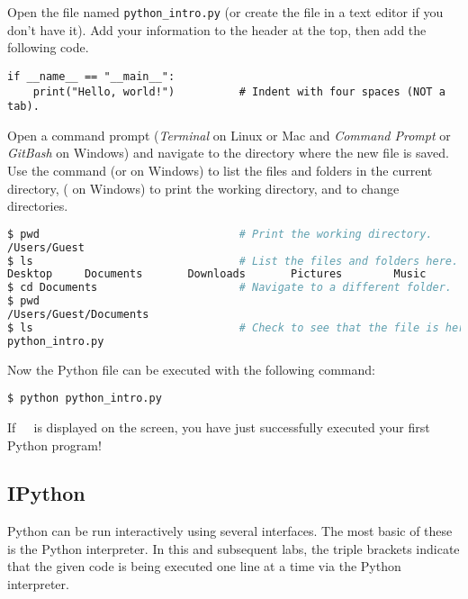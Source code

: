 \begin{problem} %
Open the file named \texttt{python\_intro.py} (or create the file in a text editor if you don't have it).
Add your information to the header at the top, then add the following code.

\begin{lstlisting}
if __name__ == "__main__":
    print("Hello, world!")          # Indent with four spaces (NOT a tab).
\end{lstlisting}

Open a command prompt (\emph{Terminal} on Linux or Mac and \emph{Command Prompt} or \emph{GitBash} on Windows) and navigate to the directory where the new file is saved.
Use the command  (or  on Windows) to list the files and folders in the current directory,  ( on Windows) to print the working directory, and  to change directories.

\begin{lstlisting}[language=bash]
$ pwd                               # Print the working directory.
/Users/Guest
$ ls                                # List the files and folders here.
Desktop     Documents       Downloads       Pictures        Music
$ cd Documents                      # Navigate to a different folder.
$ pwd
/Users/Guest/Documents
$ ls                                # Check to see that the file is here.
python_intro.py
\end{lstlisting}

Now the Python file can be executed with the following command:

\begin{lstlisting}
$ python python_intro.py
\end{lstlisting}

If $\ $  $\ $ is displayed on the screen, you have just successfully executed your first Python program!
\label{prob:helloWorld}
\end{problem}

\subsection*{IPython} %

Python can be run interactively using several interfaces.
The most basic of these is the Python interpreter.
In this and subsequent labs, the triple brackets \li{>>>} indicate that the given code is being executed one line at a time via the Python interpreter.

